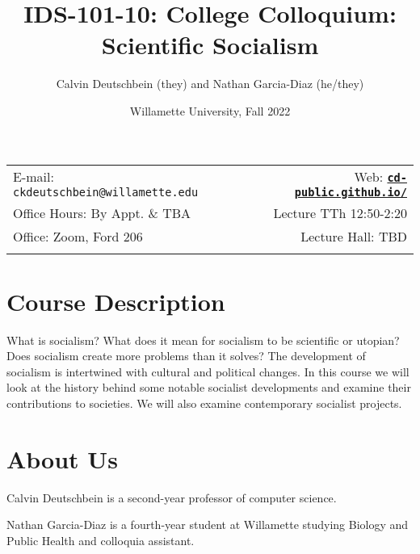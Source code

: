 \documentclass[11pt]{article}
\title{IDS-101-10: College Colloquium: Scientific Socialism}
\author{Calvin Deutschbein (they) and Nathan Garcia-Diaz (he/they)}
\date{Willamette University, Fall 2022}
\newcommand{\blankline}{\quad\pagebreak[2]}
\begin{document}
\maketitle

\blankline

\begin{tabular*}{.93\textwidth}{@{\extracolsep{\fill}}lr}


E-mail: \texttt{ckdeutschbein@willamette.edu} & Web: \href{https://cd-public.github.io/courses/soc}{\tt\bf cd-public.github.io/}  \\

 Office Hours: By Appt. \& TBA  &  Lecture TTh 12:50-2:20 \\

 Office: Zoom, Ford 206 & Lecture Hall: TBD \\
 & \\
\hline
\end{tabular*}

\vspace{5 mm}


\section*{Course Description}

What is socialism? What does it mean for socialism to be scientific or utopian? Does socialism create more problems than it solves? The development of socialism is intertwined with cultural and political changes. In this course we will look at the history behind some notable socialist developments and examine their contributions to societies. We will also examine contemporary socialist projects.

\section*{About Us}
Calvin Deutschbein is a %
second-year professor of computer science. 

Nathan Garcia-Diaz is a fourth-year student at Willamette studying Biology and Public Health and colloquia assistant.
\end{document}
